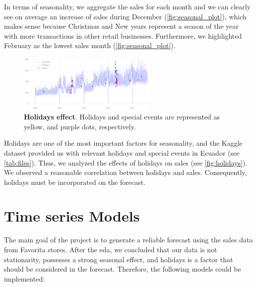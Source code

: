 In terms of seasonality, we aggregate the sales for each month and we can clearly see on average an increase of sales during December (\autoref{fig:seasonal_plot}), which makes sense because Christmas and New years represent a season of the year with more transactions in other retail businesses. Furthermore, we highlighted February as the lowest sales month (\autoref{fig:seasonal_plot}). 

\begin{figure}[!htb]
  \centering
  \includegraphics[width=0.6\textwidth]{plots/eda/holidayeffects.png}
  \caption[Holidays effect]{\textbf{Holidays effect}. Holidays and special events are represented as yellow, and purple dots, respectively.}
  \label{fig:holidays}
\end{figure}

Holidays are one of the most important factors for seasonality, and the Kaggle dataset provided us with relevant holidays and special events in Ecuador (see \autoref{tab:files}). Thus, we analyzed the effects of holidays on sales (see \autoref{fig:holidays}). We observed a reasonable correlation between holidays and sales. Consequently, holidays must be incorporated on the forecast.  

\clearpage

\section[Time series Models]{Time series Models}
\label{sec:forecast}

The main goal of the project is to generate a reliable forecast using the sales data from Favorita stores. After the eda, we concluded that our data is not stationarity, possesses a strong seasonal effect, and holidays is a factor that should be considered in the forecast.  Therefore, the following models could be implemented:

